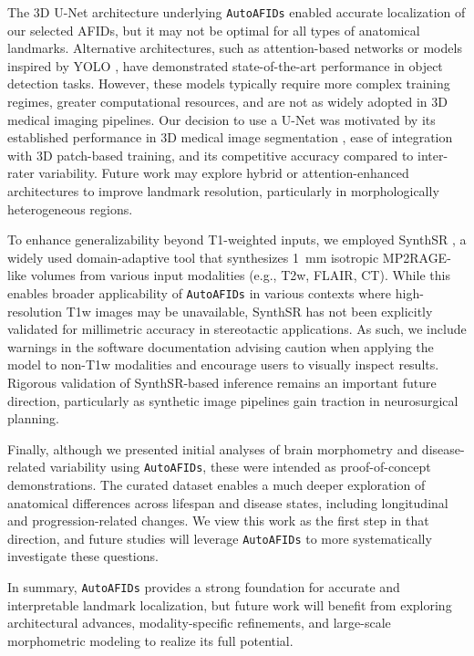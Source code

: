 The 3D U-Net architecture underlying \texttt{AutoAFIDs} enabled accurate localization of our selected AFIDs, but it may not be optimal for all types of anatomical landmarks. Alternative architectures, such as attention-based networks or models inspired by YOLO \cite{Redmon2015-ia}, have demonstrated state-of-the-art performance in object detection tasks. However, these models typically require more complex training regimes, greater computational resources, and are not as widely adopted in 3D medical imaging pipelines. Our decision to use a U-Net was motivated by its established performance in 3D medical image segmentation \cite{Cicek2016-dz}, ease of integration with 3D patch-based training, and its competitive accuracy compared to inter-rater variability. Future work may explore hybrid or attention-enhanced architectures to improve landmark resolution, particularly in morphologically heterogeneous regions.

To enhance generalizability beyond T1-weighted inputs, we employed SynthSR \cite{Iglesias2023-co}, a widely used domain-adaptive tool that synthesizes 1~mm isotropic MP2RAGE-like volumes from various input modalities (e.g., T2w, FLAIR, CT). While this enables broader applicability of \texttt{AutoAFIDs} in various contexts where high-resolution T1w images may be unavailable, SynthSR has not been explicitly validated for millimetric accuracy in stereotactic applications. As such, we include warnings in the software documentation advising caution when applying the model to non-T1w modalities and encourage users to visually inspect results. Rigorous validation of SynthSR-based inference remains an important future direction, particularly as synthetic image pipelines gain traction in neurosurgical planning.

Finally, although we presented initial analyses of brain morphometry and disease-related variability using \texttt{AutoAFIDs}, these were intended as proof-of-concept demonstrations. The curated dataset enables a much deeper exploration of anatomical differences across lifespan and disease states, including longitudinal and progression-related changes. We view this work as the first step in that direction, and future studies will leverage \texttt{AutoAFIDs} to more systematically investigate these questions.

In summary, \texttt{AutoAFIDs} provides a strong foundation for accurate and interpretable landmark localization, but future work will benefit from exploring architectural advances, modality-specific refinements, and large-scale morphometric modeling to realize its full potential.

